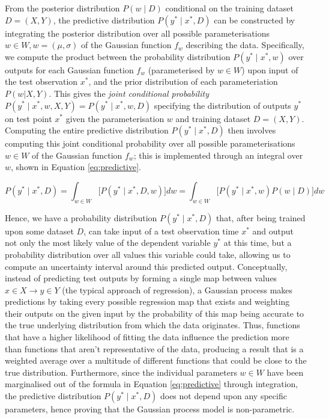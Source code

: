 \documentclass[a4paper, 11pt]{article}
\begin{document}
    From the posterior distribution $P(w \mid D)$ conditional on the training dataset $D = (X, Y)$, the predictive distribution $P(y^* \mid x^*, D)$ can be constructed by integrating the posterior distribution over all possible parameterisations $w \in W, w = (\mu, \sigma)$ of the Gaussian function $f_w$ describing the data. Specifically, we compute the product between the probability distribution $P(y^* \mid x^*, w)$ over outputs for each Gaussian function $f_w$ (parameterised by $w \in W$) upon input of the test observation $x^*$, and the prior distribution of each parameteriation $P(w | X, Y)$. This gives the \emph{joint conditional probability} $P(y^* \mid x^*, w, X, Y) = P(y^* \mid x^*, w, D)$ specifying the distribution of outputs $y^*$ on test point $x^*$ given the parameterisation $w$ and training dataset $D = (X, Y)$. Computing the entire predictive distribution $P(y^* \mid x^*, D)$ then involves computing this joint conditional probability over all possible parameterisations $w \in W$ of the Gaussian function $f_w$; this is implemented through an integral over $w$, shown in Equation \ref{eq:predictive}.

    \begin{equation}
        P(y^* \mid x^*, D) = \int_{w \in W} \big[ P(y^* \mid x^*, D, w) \big] dw = \int_{w \in W} \big[ P(y^* \mid x^*, w) P(w \mid D) \big] dw
        \label{eq:predictive}
    \end{equation}

    Hence, we have a probability distribution $P(y^* \mid x^*, D)$ that, after being trained upon some dataset $D$, can take input of a test observation time $x^*$ and output not only the most likely value of the dependent variable $y^*$ at this time, but a probability distribution over all values this variable could take, allowing us to compute an uncertainty interval around this predicted output. Conceptually, instead of predicting test outputs by forming a single map between values $x \in X \to y \in Y$ (the typical approach of regression), a Gaussian process makes predictions by taking every possible regression map that exists and weighting their outputs on the given input by the probability of this map being accurate to the true underlying distribution from which the data originates. Thus, functions that have a higher likelihood of fitting the data influence the prediction more than functions that aren’t representative of the data, producing a result that is a weighted average over a multitude of different functions that could be close to the true distribution. Furthermore, since the individual parameters $w \in W$ have been marginalised out of the formula in Equation \ref{eq:predictive} through integration, the predictive distribution $P(y^* \mid x^*, D)$ does not depend upon any specific parameters, hence proving that the Gaussian process model is non-parametric.
\end{document}
